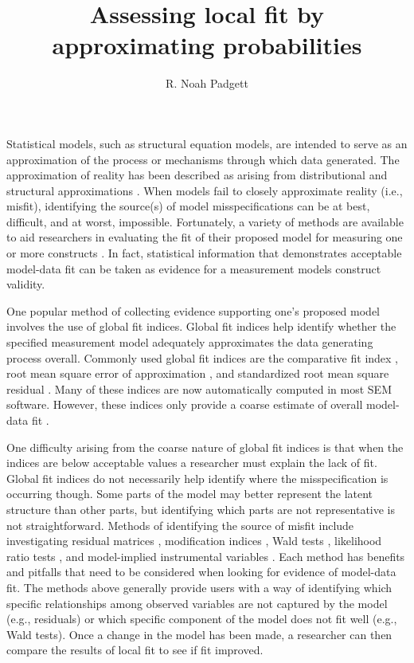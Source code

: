 \documentclass[man, noextraspace, floatsintext, 12pt]{apa7}
\title{Assessing local fit by approximating probabilities}
\author{R. Noah Padgett}
\begin{document}
\maketitle

\setlength{\abovedisplayskip}{3pt}
\setlength{\belowdisplayskip}{3pt}

Statistical models, such as structural equation models, are intended to serve as an approximation of the process or mechanisms through which data generated.
The approximation of reality has been described as arising from distributional and structural approximations \citep{Bollen2019}.
When models fail to closely approximate reality (i.e., misfit), identifying the source(s) of model misspecifications can be at best, difficult, and at worst, impossible.
Fortunately, a variety of methods are available to aid researchers in evaluating the fit of their proposed model for measuring one or more constructs \citep{DiStefano2016}. 
In fact, statistical information that demonstrates acceptable model-data fit can be taken as evidence for a measurement models construct validity.

One popular method of collecting evidence supporting one's proposed model involves the use of global fit indices.
Global fit indices help identify whether the specified measurement model adequately approximates the data generating process overall. 
Commonly used global fit indices are the comparative fit index \citep{Bentler1990},  root mean square error of approximation \citep{Browne1992}, and standardized root mean square residual \citep{Bentler1995, Maydeu2018, Joreskog1981}.
Many of these indices are now automatically computed in most SEM software.
However, these indices only provide a coarse estimate of overall model-data fit \citep{Steiger2007}.

One difficulty arising from the coarse nature of global fit indices is that when the indices are below acceptable values a researcher must explain the lack of fit. 
Global fit indices do not necessarily help identify where the misspecification is occurring though.
Some parts of the model may better represent the latent structure than other parts, but identifying which parts are not representative is not straightforward.
Methods of identifying the source of misfit include investigating residual matrices \citep{Kline2015, Maydeu2017}, modification indices \citep{Sorbom1989, Kaplan1989}, Wald tests \citep{Wald1943, Buse1982}, likelihood ratio tests \citep{Neyman1928, Buse1982}, and model-implied instrumental variables \citep{Bollen1995, Bollen2019}.
Each method has benefits and pitfalls that need to be considered when looking for evidence of model-data fit. 
The methods above generally provide users with a way of identifying which specific relationships among observed variables are not captured by the model (e.g., residuals) or which specific component of the model does not fit well (e.g., Wald tests).
Once a change in the model has been made, a researcher can then compare the results of local fit to see if fit improved.
\end{document}

